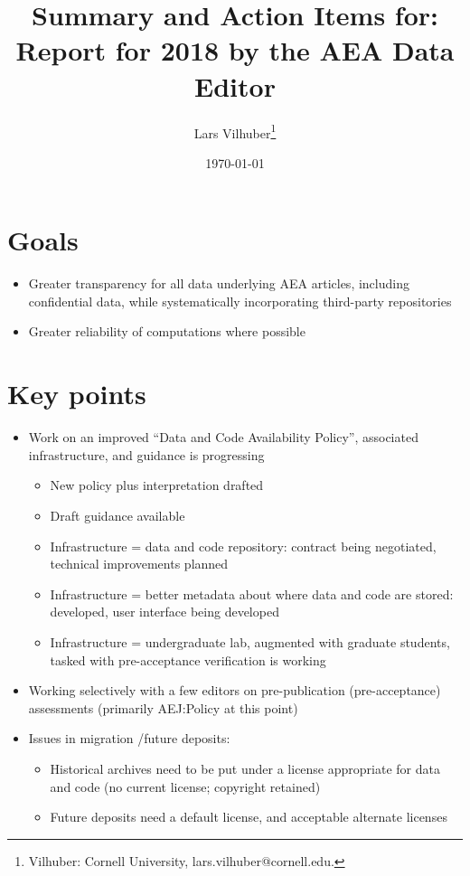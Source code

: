\documentclass[AEJ]{AEA}
\begin{document}
	
	\title{Summary and Action Items for: Report for 2018 by the AEA Data Editor }
	\author{Lars Vilhuber\thanks{%
			Vilhuber: Cornell University, lars.vilhuber@cornell.edu.}}
	\date{\today}
	\pubVolume{}
	\pubIssue{}
	\JEL{}
	
	
	\begin{abstract}
		
	\end{abstract}
	
	\maketitle
	
\section{Goals}
\begin{itemize}
	\item Greater transparency for all data underlying AEA articles, including confidential data, while systematically incorporating third-party repositories
	\item Greater reliability of computations where possible
\end{itemize}

\section{Key points}
\begin{itemize}
	\item Work on an improved ``Data and Code Availability Policy'', associated infrastructure, and guidance is progressing
	\begin{itemize}
		\item New policy plus interpretation drafted
		\item Draft guidance available
		\item Infrastructure = data and code repository: contract being negotiated, technical improvements planned
		\item Infrastructure = better metadata about where data and code are stored: developed, user interface being developed
		\item Infrastructure = undergraduate lab, augmented with graduate students, tasked with pre-acceptance verification is working
	\end{itemize}
	\item Working selectively with a few editors on pre-publication (pre-acceptance) assessments (primarily AEJ:Policy at this point)
	\item Issues in migration /future deposits:
	\begin{itemize}
		\item Historical archives need to be put under a license appropriate for data and code (no current license; copyright retained)
		\item Future deposits need a default license, and acceptable alternate licenses
	\end{itemize}
\end{itemize}
\end{document}
